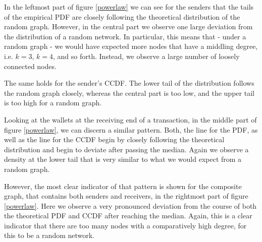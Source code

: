 In the leftmost part of figure \ref{powerlaw} we can see for the senders that the tails of the empirical PDF are closely following the theoretical distribution of the random graph. However, in the central part we observe one large deviation from the distribution of a random network. In particular, this means that - under a random graph - we would have expected more nodes that have a middling degree, i.e. $k=3$, $k=4$, and so forth. Instead, we observe a large number of loosely connected nodes.

The same holds for the sender's CCDF. The lower tail of the distribution follows the random graph closely, whereas the central part is too low, and the upper tail is too high for a random graph.

Looking at the wallets at the receiving end of a transaction, in the middle part of figure \ref{powerlaw}, we can discern a similar pattern. Both, the line for the PDF, as well as the line for the CCDF begin by closely following the theoretical distribution and begin to deviate after passing the median. Again we observe a density at the lower tail that is very similar to what we would expect from a random graph.

However, the most clear indicator of that pattern is shown for the composite graph, that contains both senders and receivers, in the rightmost part of figure \ref{powerlaw}. Here we observe a very pronounced deviation from the course of both the theoretical PDF and CCDF after reaching the median. Again, this is a clear indicator that there are too many nodes with a comparatively high degree, for this to be a random network.

